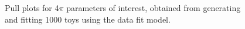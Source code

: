 \begin{figure}
\begin{tabular}{c}
  \end{tabular}
  \caption{Pull plots for 4$\pi$ parameters of interest, obtained from generating and fitting 1000 toys using the data fit model.}
\label{fig:4pi_pulls}
\end{figure}
